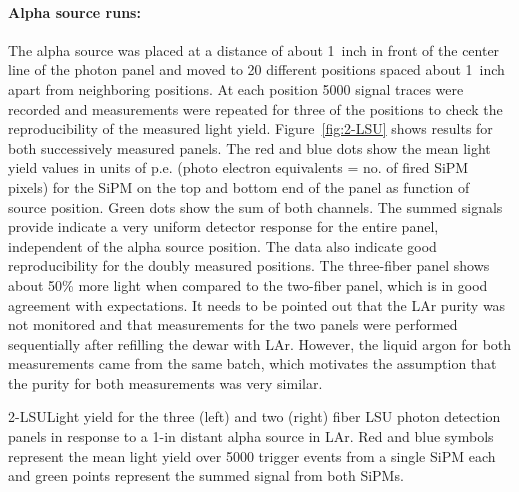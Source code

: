 \paragraph{Alpha source runs:} The alpha source was placed at a
distance of about 1~inch in front of the center line of the photon
panel and moved to 20 different positions spaced about 1~inch apart
from neighboring positions. At each position 5000 signal traces were
recorded and measurements were repeated for three of the positions to
check the reproducibility of the measured light
yield. Figure~\ref{fig:2-LSU} shows results for both successively
measured panels. The red and blue dots show the mean light yield
values in units of p.e. (photo electron equivalents = no. of fired
SiPM pixels) for the SiPM on the top and bottom end of the panel as
function of source position. Green dots show the sum of both
channels. The summed signals provide indicate a very uniform detector
response for the entire panel, independent of the alpha source
position. The data also indicate good reproducibility for the doubly
measured positions.  The three-fiber panel shows about 50\% more light
when compared to the two-fiber panel, which is in good agreement with
expectations. It needs to be pointed out that the LAr purity was not
monitored and that measurements for the two panels were performed
sequentially after refilling the dewar with LAr. However, the liquid
argon for both measurements came from the same batch, which motivates
the assumption that the purity for both measurements was very similar.

%
\begin{cdrfigure}{2-LSU}{Light yield for the three (left) and two (right) fiber LSU photon
  detection panels in response to a 1-in distant alpha source in
  LAr. Red and blue symbols represent the mean light yield over 5000
  trigger events from a single SiPM each and green points represent
 the summed signal from both SiPMs.}
\end{cdrfigure}

%
